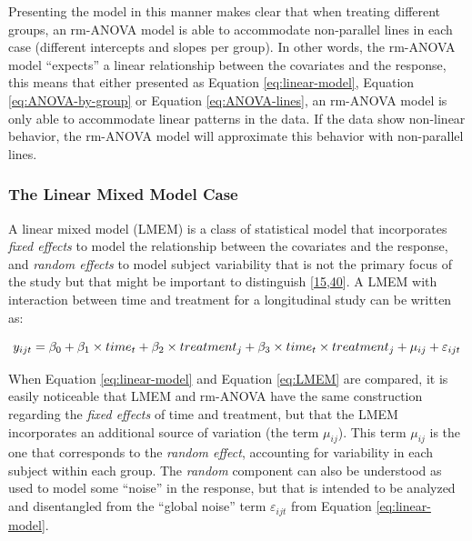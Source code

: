 \documentclass[
]{article}
\begin{document}
Presenting the model in this manner makes clear that when treating different groups, an rm-ANOVA model is able to accommodate non-parallel lines in each case (different intercepts and slopes per group). In other words, the rm-ANOVA model ``expects'' a linear relationship between the covariates and the response, this means that either presented as Equation \eqref{eq:linear-model}, Equation \eqref{eq:ANOVA-by-group} or Equation \eqref{eq:ANOVA-lines}, an rm-ANOVA model is only able to accommodate linear patterns in the data. If the data show non-linear behavior, the rm-ANOVA model will approximate this behavior with non-parallel lines.

\hypertarget{the-linear-mixed-model-case}{%
\subsubsection{The Linear Mixed Model Case}\label{the-linear-mixed-model-case}}

A linear mixed model (LMEM) is a class of statistical model that incorporates \emph{fixed effects} to model the relationship between the covariates and the response, and \emph{random effects} to model subject variability that is not the primary focus of the study but that might be important to distinguish {[}\protect\hyperlink{ref-pinheiro2006}{15},\protect\hyperlink{ref-west2014}{40}{]}. A LMEM with interaction between time and treatment for a longitudinal study can be written as:

\begin{equation}
y_{ijt} = \beta_0+ \beta_1 \times time_{t} + \beta_2 \times treatment_{j} + \beta_3 \times time_{t}\times treatment_{j}+\mu_{ij} +\varepsilon_{ijt}\\ 
\label{eq:LMEM}
\end{equation}

When Equation \eqref{eq:linear-model} and Equation \eqref{eq:LMEM} are compared, it is easily noticeable that LMEM and rm-ANOVA have the same construction regarding the \emph{fixed effects} of time and treatment, but that the LMEM incorporates an additional source of variation (the term \(\mu_{ij}\)). This term \(\mu_{ij}\) is the one that corresponds to the \emph{random effect}, accounting for variability in each subject within each group. The \emph{random} component can also be understood as used to model some ``noise'' in the response, but that is intended to be analyzed and disentangled from the ``global noise'' term \(\varepsilon_{ijt}\) from Equation \eqref{eq:linear-model}.
\end{document}
